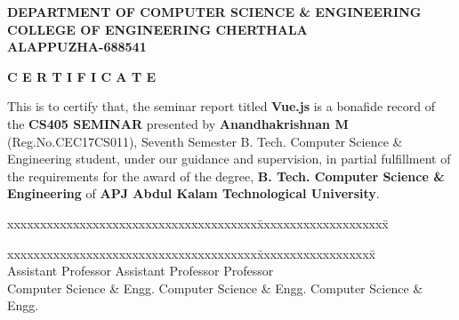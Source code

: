 \documentclass[12pt,a4paper,oneside]{report}
\begin{document}
\begin{titlepage}
\begin{center}

\large{\textbf{DEPARTMENT OF COMPUTER SCIENCE \& ENGINEERING}}\\
\large{\textbf{COLLEGE OF ENGINEERING CHERTHALA\\ALAPPUZHA-688541}}\\
\end{center}
\begin{figure}[h]
\begin{center}
\end{center}
\end{figure}
\begin{center}
\large{\textbf{C E R T I F I C A T E}}\\
\end{center}
\begin{spacing}{1.5}
This is to certify that, the seminar report titled  \textbf{{Vue.js}} is a bonafide record of the \textbf{CS405 SEMINAR} presented by \textbf{Anandhakrishnan M} (Reg.No.CEC17CS011), Seventh Semester B. Tech. Computer Science \& Engineering  student,  under our guidance and supervision, in partial fulfillment of the requirements for the award of the degree, \textbf{B. Tech. Computer Science  \& Engineering } of \textbf{APJ Abdul Kalam Technological University}.
\end{spacing}
\begin{tabbing}
xxxxxxxxxxxxxxxxxxxxxxxxxxxxxxxxxxxxxx\= xxxxxxxxxxxxxxxxxxxx\= \kill
\hspace{.15in}{\bf Guide } \>\hspace{-.7in}{\bf Co-ordinator}\hspace{1.4in}{\bf  HoD  } \\
\end{tabbing}

\begin{tabbing}
xxxxxxxxxxxxxxxxxxxxxxxxxxxxxxxxxxxxxx\= xxxxxxxxxxxxxxxxxx\= \kill
   \>\hspace{-.7in}{\bf Greeshma N.Gopal} \hspace{.91 in}{\bf Dr. Priya S}\\
\hspace{.15in}Assistant Professor    \>\hspace{-.7in}Assistant Professor\>\hspace{.05in} Professor\\
\hspace{.1in} Computer Science \& Engg.    \>\hspace{-.75in}Computer Science \& Engg. \>\hspace{.03in}    Computer Science \& Engg.\\

\end{tabbing}
\end{titlepage}
\end{document}
